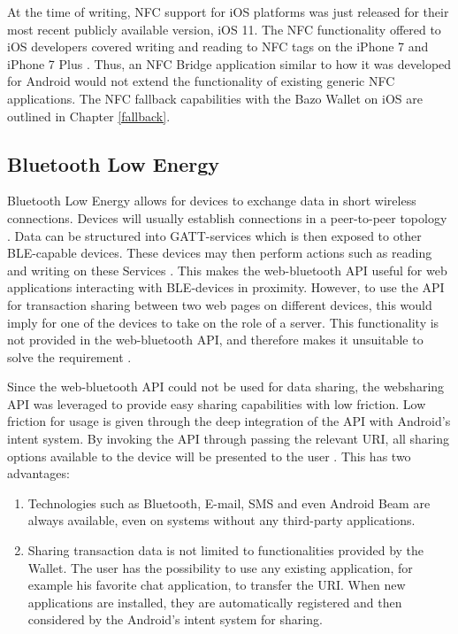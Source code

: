 At the time of writing, NFC support for iOS platforms was just released for their most recent publicly available version, iOS 11. The NFC functionality offered to iOS developers covered writing and reading to NFC tags on the iPhone 7 and iPhone 7 Plus \cite{corenfc}. Thus, an NFC Bridge application similar to how it was developed for Android would not extend the functionality of existing generic NFC applications. The NFC fallback capabilities with the Bazo Wallet on iOS are outlined in Chapter \ref{fallback}.
\subsection{Bluetooth Low Energy}\label{ble}
Bluetooth Low Energy allows for devices to exchange data in short wireless connections. Devices will usually establish connections in a peer-to-peer topology \cite{blep2p}. Data can be structured into GATT-services which is then exposed to other BLE-capable devices. These devices may then perform actions such as reading and writing on these Services \cite{blegatt}.
This makes the web-bluetooth API useful for web applications interacting with BLE-devices in proximity. However, to use the API for transaction sharing between two web pages on different devices, this would imply for one of the devices to take on the role of a server. This functionality is not provided in the web-bluetooth API, and therefore makes it unsuitable to solve the requirement \cite{webble}.

Since the web-bluetooth API could not be used for data sharing, the websharing API was leveraged to provide easy sharing capabilities with low friction. Low friction for usage is given through the deep integration of the API with Android's intent system. By invoking the API through passing the relevant URI, all sharing options available to the device will be presented to the user \cite{webshareapi}. This has two advantages:
\begin{enumerate}
\item Technologies such as Bluetooth, E-mail, SMS and even Android Beam are always available, even on systems without any third-party applications.
\item Sharing transaction data is not limited to functionalities provided by the Wallet. The user has the possibility to use any existing application, for example his favorite chat application, to transfer the URI. When new applications are installed, they are automatically registered and then considered by the Android's intent system for sharing.
\end{enumerate}

